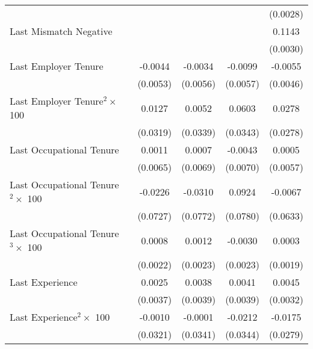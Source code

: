 {\begin{longtable}{l*{4}{c}}
                    &                     &                     &                     &    (0.0028)         \\
Last Mismatch Negative&                     &                     &                     &      0.1143\sym{***}\\
                    &                     &                     &                     &    (0.0030)         \\
Last Employer Tenure&     -0.0044         &     -0.0034         &     -0.0099\sym{*}  &     -0.0055         \\
                    &    (0.0053)         &    (0.0056)         &    (0.0057)         &    (0.0046)         \\
Last Employer Tenure$^2 \times$ 100&      0.0127         &      0.0052         &      0.0603\sym{*}  &      0.0278         \\
                    &    (0.0319)         &    (0.0339)         &    (0.0343)         &    (0.0278)         \\
Last Occupational Tenure&      0.0011         &      0.0007         &     -0.0043         &      0.0005         \\
                    &    (0.0065)         &    (0.0069)         &    (0.0070)         &    (0.0057)         \\
Last Occupational Tenure$^2 \times$ 100&     -0.0226         &     -0.0310         &      0.0924         &     -0.0067         \\
                    &    (0.0727)         &    (0.0772)         &    (0.0780)         &    (0.0633)         \\
Last Occupational Tenure$^3 \times$ 100&      0.0008         &      0.0012         &     -0.0030         &      0.0003         \\
                    &    (0.0022)         &    (0.0023)         &    (0.0023)         &    (0.0019)         \\
Last Experience     &      0.0025         &      0.0038         &      0.0041         &      0.0045         \\
                    &    (0.0037)         &    (0.0039)         &    (0.0039)         &    (0.0032)         \\
Last Experience$^2 \times$ 100&     -0.0010         &     -0.0001         &     -0.0212         &     -0.0175         \\
                    &    (0.0321)         &    (0.0341)         &    (0.0344)         &    (0.0279)         \\

\end{longtable}}
